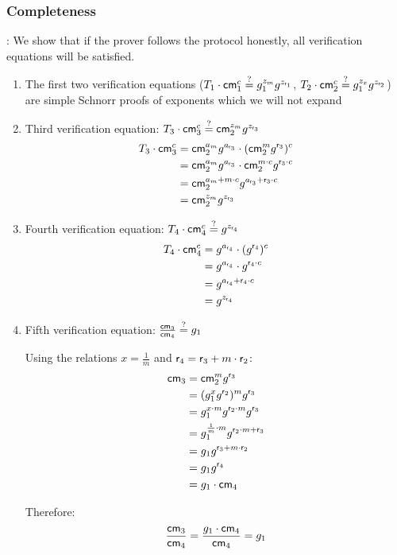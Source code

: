\subsubsection*{Completeness}:
We show that if the prover follows the protocol honestly, all verification equations will be satisfied.

\begin{enumerate}
    \item The first two verification equations ($T_1 \cdot \mathsf{cm}_1^c \stackrel{?}{=} g_1^{z_m} g^{z_{\mathsf{r}_1}}$, $T_2 \cdot \mathsf{cm}_2^c \stackrel{?}{=} g_1^{z_x} g^{z_{\mathsf{r}_2}}$) are simple Schnorr proofs of exponents which we will not expand 
        
    \item Third verification equation: $T_3 \cdot \mathsf{cm}_3^c \stackrel{?}{=} \mathsf{cm}_2^{z_m} g^{z_{\mathsf{r}_3}}$
    \begin{align*}
        T_3 \cdot \mathsf{cm}_3^c &= \mathsf{cm}_2^{a_m} g^{a_{\mathsf{r}_3}} \cdot (\mathsf{cm}_2^m g^{\mathsf{r}_3})^c \\
        &= \mathsf{cm}_2^{a_m} g^{a_{\mathsf{r}_3}} \cdot \mathsf{cm}_2^{m \cdot c} g^{\mathsf{r}_3 \cdot c} \\
        &= \mathsf{cm}_2^{a_m + m \cdot c} g^{a_{\mathsf{r}_3} + \mathsf{r}_3 \cdot c} \\
        &= \mathsf{cm}_2^{z_m} g^{z_{\mathsf{r}_3}}
    \end{align*}
    
    \item Fourth verification equation: $T_4 \cdot \mathsf{cm}_4^c \stackrel{?}{=} g^{z_{\mathsf{r}_4}}$
    \begin{align*}
        T_4 \cdot \mathsf{cm}_4^c &= g^{a_{\mathsf{r}_4}} \cdot (g^{\mathsf{r}_4})^c \\
        &= g^{a_{\mathsf{r}_4}} \cdot g^{\mathsf{r}_4 \cdot c} \\
        &= g^{a_{\mathsf{r}_4} + \mathsf{r}_4 \cdot c} \\
        &= g^{z_{\mathsf{r}_4}}
    \end{align*}
    
    \item Fifth verification equation: $\frac{\mathsf{cm}_3}{\mathsf{cm}_4} \stackrel{?}{=} g_1$
    
    Using the relations $x = \frac{1}{m}$ and $\mathsf{r}_4 = \mathsf{r}_3 + m \cdot \mathsf{r}_2$:
    \begin{align*}
        \mathsf{cm}_3 &= \mathsf{cm}_2^m g^{\mathsf{r}_3} \\
        &= (g_1^x g^{\mathsf{r}_2})^m g^{\mathsf{r}_3} \\
        &= g_1^{x \cdot m} g^{\mathsf{r}_2 \cdot m} g^{\mathsf{r}_3} \\
        &= g_1^{\frac{1}{m} \cdot m} g^{\mathsf{r}_2 \cdot m + \mathsf{r}_3} \\
        &= g_1 g^{\mathsf{r}_3 + m \cdot \mathsf{r}_2} \\
        &= g_1 g^{\mathsf{r}_4} \\
        &= g_1 \cdot \mathsf{cm}_4
    \end{align*}
    
    Therefore:
    \begin{align*}
        \frac{\mathsf{cm}_3}{\mathsf{cm}_4} = \frac{g_1 \cdot \mathsf{cm}_4}{\mathsf{cm}_4} = g_1
    \end{align*}
\end{enumerate}

